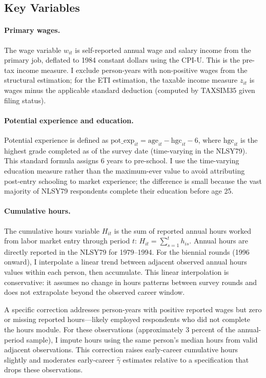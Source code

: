 \documentclass[12pt]{article}
\theoremstyle{definition}
\theoremstyle{remark}
\begin{document}
\subsection{Key Variables}

\paragraph{Primary wages.} The wage variable $w_{it}$ is self-reported annual wage and salary
income from the primary job, deflated to 1984 constant dollars using the CPI-U. This is the
pre-tax income measure. I exclude person-years with non-positive wages from the structural
estimation; for the ETI estimation, the taxable income measure $z_{it}$ is wages minus the
applicable standard deduction (computed by TAXSIM35 given filing status).

\paragraph{Potential experience and education.} Potential experience is defined as
$\text{pot\_exp}_{it} = \text{age}_{it} - \text{hgc}_{it} - 6$, where $\text{hgc}_{it}$
is the highest grade completed as of the survey date (time-varying in the NLSY79). This
standard formula assigns 6 years to pre-school. I use the time-varying education measure
rather than the maximum-ever value to avoid attributing post-entry schooling to market
experience; the difference is small because the vast majority of NLSY79 respondents
complete their education before age 25.

\paragraph{Cumulative hours.} The cumulative hours variable $H_{it}$ is the sum of reported
annual hours worked from labor market entry through period $t$: $H_{it} = \sum_{s=1}^{t} h_{is}$.
Annual hours are directly reported in the NLSY79 for 1979--1994. For the biennial rounds
(1996 onward), I interpolate a linear trend between adjacent observed annual hours values
within each person, then accumulate. This linear interpolation is conservative: it assumes
no change in hours patterns between survey rounds and does not extrapolate beyond the
observed career window.

A specific correction addresses person-years with positive reported wages but zero or missing
reported hours---likely employed respondents who did not complete the hours module. For these
observations (approximately 3 percent of the annual-period sample), I impute hours using the
same person's median hours from valid adjacent observations. This correction raises early-career
cumulative hours slightly and moderates early-career $\hat{\gamma}$ estimates relative to a
specification that drops these observations.
\end{document}
